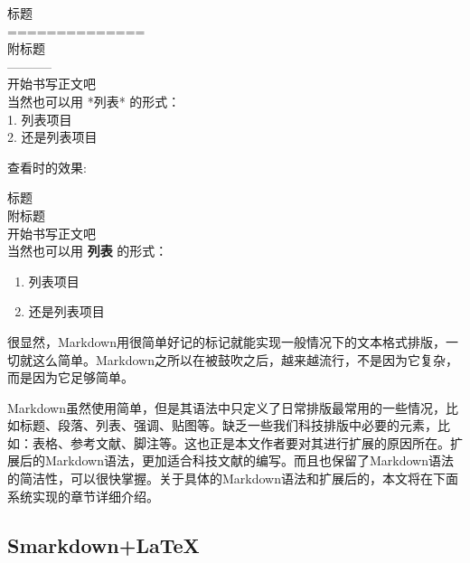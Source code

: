 \begin{bframe}
  \noindent
  标题\\
  ==============\\
  附标题\\
  -----------\\
  开始书写正文吧\\
  当然也可以用 *列表* 的形式：\\
  1.   列表项目\\
  2.   还是列表项目\\
\end{bframe}
{\noindent 查看时的效果:}
\begin{bframe}
  \noindent
  {\erhao 标题}\\
  {\sanhao 附标题}\\
  开始书写正文吧\\
  当然也可以用 {\bfseries 列表} 的形式：
  \begin{enumerate}
  \item 列表项目
  \item 还是列表项目
  \end{enumerate}
\end{bframe}
很显然，Markdown用很简单好记的标记就能实现一般情况下的文本格式排版，一切就这么简单。Markdown之所以在被鼓吹之后，越来越流行，不是因为它复杂，而是因为它足够简单。

Markdown虽然使用简单，但是其语法中只定义了日常排版最常用的一些情况，比如标题、段落、列表、强调、贴图等。缺乏一些我们科技排版中必要的元素，比如：表格、参考文献、脚注等。这也正是本文作者要对其进行扩展的原因所在。扩展后的Markdown语法，更加适合科技文献的编写。而且也保留了Markdown语法的简洁性，可以很快掌握。关于具体的Markdown语法和扩展后的，本文将在下面系统实现的章节详细介绍。

\subsection{Smarkdown+\LaTeX}
\label{sec:sandl}

